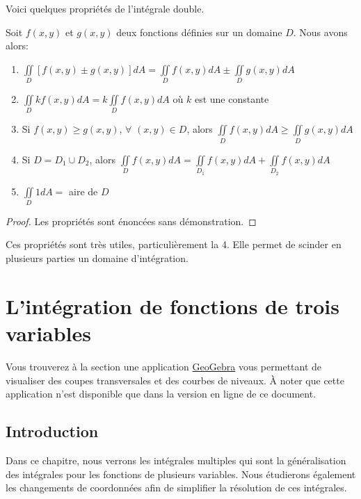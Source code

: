 \documentclass[]{book}
\theoremstyle{definition}
\theoremstyle{definition}
\theoremstyle{definition}
\theoremstyle{remark}
\let\BeginKnitrBlock\begin \let\EndKnitrBlock\end
\begin{document}
Voici quelques propriétés de l'intégrale double.
\BeginKnitrBlock{theorem}
\protect\hypertarget{thm:unnamed-chunk-254}{}{\label{thm:unnamed-chunk-254}
}Soit \(f(x,y)\) et \(g(x,y)\) deux fonctions définies sur un domaine
\(D\). Nous avons alors:

\begin{enumerate}
\def\labelenumi{\arabic{enumi}.}
\item
  \(\iint\limits_D \left[f(x,y)\pm g(x,y)\right]dA=\iint\limits_D f(x,y)dA \pm \iint\limits_D g(x,y)dA\)
\item
  \(\iint\limits_D kf(x,y)dA=k\iint\limits_D f(x,y)dA\) où \(k\) est une
  constante
\item
  Si \(f(x,y)\geq g(x,y)\), \(\forall\) \((x,y)\in D\), alors
  \(\iint\limits_D f(x,y)dA\geq \iint\limits_D g(x,y)dA\)
\item
  Si \(D=D_1 \cup D_2\), alors
  \(\iint\limits_D f(x,y)dA=\iint\limits_{D_1} f(x,y)dA+\iint\limits_{D_2} f(x,y)dA\)
\item
  \(\iint\limits_D 1dA=\) aire de \(D\)
\end{enumerate}
\EndKnitrBlock{theorem}

\BeginKnitrBlock{proof}
{}Les propriétés sont énoncées sans
démonstration.
\EndKnitrBlock{proof}

Ces propriétés sont très utiles, particulièrement la 4. Elle permet de
scinder en plusieurs parties un domaine d'intégration.

\hypertarget{intfct3vars}{%
\chapter{L'intégration de fonctions de trois
variables}\label{intfct3vars}}

Vous trouverez à la section une application
\href{https://www.geogebra.org/?lang=fr}{GeoGebra} vous permettant de
visualiser des coupes transversales et des courbes de niveaux. À noter
que cette application n'est disponible que dans la version en ligne de
ce document.

\hypertarget{introduction-7}{%
\section{Introduction}\label{introduction-7}}

Dans ce chapitre, nous verrons les intégrales multiples qui sont la
généralisation des intégrales pour les fonctions de plusieurs variables.
Nous étudierons également les changements de coordonnées afin de
simplifier la résolution de ces intégrales.


\end{document}
